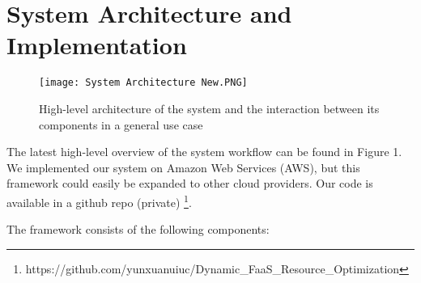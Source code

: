\documentclass[conference]{IEEEtran}
\begin{document}
\section{System Architecture and Implementation}

\begin{figure*}
    \centering
    \texttt{[image: System Architecture New.PNG]}
    \caption{High-level architecture of the system and the interaction
between its components in a general use case}
    \label{fig:enter-label}
\end{figure*}

The latest high-level overview of the system workflow can be found in Figure 1. We implemented our system on Amazon Web Services (AWS), but this framework could easily be expanded to other cloud providers. Our code is available in a github repo (private) \footnote{https://github.com/yunxuanuiuc/Dynamic\_FaaS\_Resource\_Optimization}. 

The framework consists of the following components:
\end{document}
